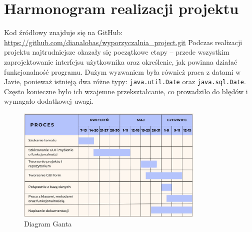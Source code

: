 \section{Harmonogram realizacji projektu}
Kod źródłowy znajduje się na GitHub: \url{https://github.com/dianalobas/wyporzyczalnia_project.git}
\newline
Podczas realizacji projektu najtrudniejsze okazały się początkowe etapy – przede wszystkim zaprojektowanie interfejsu użytkownika oraz określenie, jak powinna działać funkcjonalność programu. Dużym wyzwaniem była również praca z datami w Javie, ponieważ istnieją dwa różne typy: \texttt{java.util.Date} oraz \texttt{java.sql.Date}. Często konieczne było ich wzajemne przekształcanie, co prowadziło do błędów i wymagało dodatkowej uwagi.
\begin{figure}[h]
    \centering
    \includegraphics[width=0.8\textwidth]{figures/diagram_ganta.jpg}
    \caption{Diagram Ganta}
\end{figure}











